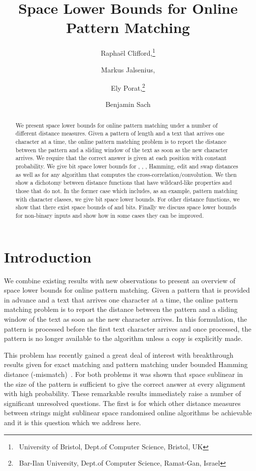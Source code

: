 \documentclass{article}
\title{Space Lower Bounds for Online Pattern Matching}
\author{
    Rapha\"{e}l Clifford,\thanks{~University of Bristol, Dept.\@ of Computer Science, Bristol, UK}
    \and Markus Jalsenius,\footnotemark[1]\\
    \and Ely Porat,\thanks{~Bar-Ilan University, Dept.\@ of Computer Science, Ramat-Gan, Israel}
    \and Benjamin Sach\footnotemark[1]}
\date{}
\theoremstyle{plain}
\theoremstyle{definition}
\begin{document}
\maketitle

\begin{abstract}
    We present space lower bounds for online pattern matching under a number of different distance measures. Given a pattern of length  and a text that arrives one character at a time, the online pattern matching problem is to report the distance between the pattern and a sliding window of the text as soon as the new character arrives. We require that the correct answer is given at each position with constant probability. We give  bit space lower bounds for , , , Hamming, edit and swap distances as well as for any algorithm that computes the cross-correlation/convolution. We then show a dichotomy between distance functions that have wildcard-like properties and those that do not. In the former case which includes, as an example, pattern matching with character classes, we give  bit space lower bounds. For other distance functions, we show that there exist space bounds of  and  bits. Finally we discuss space lower bounds for non-binary inputs and show how in some cases they can be improved.
\end{abstract}


\section{Introduction}
We combine existing results with new observations to present an overview of space lower bounds for online pattern matching.  Given a pattern that is provided in advance and a text that arrives one character at a time, the online pattern matching problem is to report the distance between the pattern and a sliding window of the text as soon as the new character arrives. In this formulation, the pattern is processed before the first text character arrives and once processed, the pattern is no longer available to the algorithm unless a copy is explicitly made.

This problem has recently gained a great deal of interest with breakthrough results
 given for exact matching and pattern matching under bounded
Hamming distance (-mismatch)~\cite{Porat:09}.
For both problems it was shown that space sublinear in the size of the pattern is sufficient to give the correct answer at every alignment with high probability.  These remarkable results immediately raise a number of significant unresolved questions. The first is for which other distance measures between strings might sublinear space randomised online algorithms be achievable and it is this question which we address here.
\end{document}
